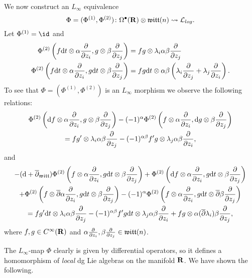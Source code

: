 \documentclass[11pt]{amsart}
\begin{document}
We now construct an $L_\infty$ equivalence 
\begin{equation}
\Phi = (\Phi^{(1)}, \Phi^{(2)}) \colon \Omega^\bullet(\mathbf{R}) \otimes \mathfrak{witt}(n) \rightsquigarrow \mathcal L_{log} .
\end{equation}
Let $\Phi^{(1)} = \id$ and 
\begin{align*}
\Phi^{(2)}\left(f {\rm d} t\otimes \alpha \frac{\partial}{\partial z_i} , g \otimes \beta \frac{\partial}{\partial z_j} \right) & = fg \otimes \lambda_i \alpha \beta \frac{\partial}{\partial z_j} \\
\Phi^{(2)}\left(f {\rm d} t \otimes \alpha \frac{\partial}{\partial z_i} , g {\rm d} t \otimes \beta \frac{\partial}{\partial z_j} \right) & = fg {\rm d} t \otimes \alpha \beta \left(\lambda_i \frac{\partial}{\partial z_j} + \lambda_j \frac{\partial}{\partial z_i} \right) .
\end{align*}
To see that $\Phi = (\Phi^{(1)}, \Phi^{(2)})$ is an $L_\infty$ morphism we observe the following relations:
\begin{multline}
\Phi^{(2)}\left({\rm d} f \otimes \alpha \frac{\partial}{\partial z_i} , g \otimes \beta \frac{\partial}{\partial z_j}\right) - (-1)^{\alpha} \Phi^{(2)}\left(f \otimes \alpha \frac{\partial}{\partial z_i} , {\rm d} g \otimes \beta \frac{\partial}{\partial z_j}\right) \\ = f g' \otimes \lambda_i \alpha \beta \frac{\partial}{\partial z_j} - (-1)^{\alpha \beta} f' g \otimes \lambda_j \alpha \beta  \frac{\partial}{\partial z_i} ,
\end{multline}
and
\begin{multline}
- ({\rm d} + \overline{\partial}_{\mathfrak{witt}}) \Phi^{(2)}\left(f \otimes \alpha \frac{\partial}{\partial z_i} , g {\rm d} t \otimes \beta \frac{\partial}{\partial z_j}\right) + \Phi^{(2)}\left({\rm d} f \otimes \alpha \frac{\partial}{\partial z_i} , g {\rm d} t \otimes \beta \frac{\partial}{\partial z_j}\right) \\ + \Phi^{(2)}\left(f \otimes \overline{\partial} \alpha \frac{\partial}{\partial z_i} , g {\rm d} t \otimes \beta \frac{\partial}{\partial z_j}\right) - (-1)^\alpha \Phi^{(2)}\left(f \otimes \alpha \frac{\partial}{\partial z_i} , g {\rm d} t \otimes \overline{\partial} \beta \frac{\partial}{\partial z_j}\right)  \\ = f g' {\rm d} t \otimes \lambda_i \alpha \beta \frac{\partial}{\partial z_j} - (-1)^{\alpha \beta} f' g {\rm d} t \otimes \lambda_j \alpha \beta  \frac{\partial}{\partial z_i} + fg \otimes \alpha (\overline{\partial} \lambda_i) \beta \frac{\partial}{\partial z_j} ,
\end{multline}
where $f,g \in C^\infty(\mathbf{R})$ and $\alpha \frac{\partial}{\partial z_i}, \beta \frac{\partial}{\partial z_j} \in \mathfrak{witt}(n)$.

The $L_\infty$-map $\Phi$ clearly is given by differential operators, so it defines a homomorphism of \textit{local} dg Lie algebras on the manifold $\mathbf{R}$.
We have shown the following.
\end{document}
